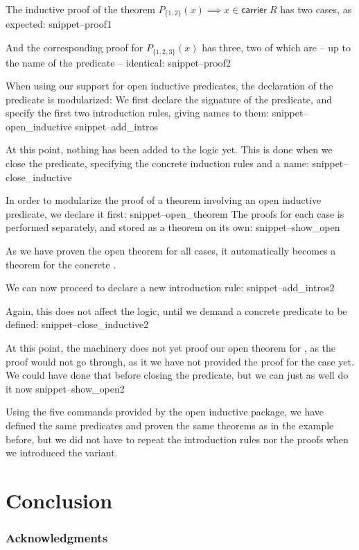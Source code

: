 \documentclass{llncs}
\newcommand{\carrier}[1]{\mathsf{carrier}\;#1}
\newcommand{\Snippet}[1]{\csname snippet--#1\endcsname}
\begin{document}
The inductive proof of the theorem $P_{\{1,2\}}(x) \implies x\in \carrier R$ has two cases, as expected:
\Snippet{proof1}

And the corresponding proof for $P_{\{1,2,3\}}(x)$ has three, two of which are -- up to the name of the predicate -- identical:
\Snippet{proof2}

When using our support for open inductive predicates, the declaration of the predicate is modularized: We first declare the signature of the predicate, and specify the first two introduction rules, giving names to them:
\Snippet{open_inductive}
\Snippet{add_intros}

At this point, nothing has been added to the logic yet. This is done when we close the predicate, specifying the concrete induction rules and a name:
\Snippet{close_inductive}

In order to modularize the proof of a theorem involving an open inductive predicate, we declare it first:
\Snippet{open_theorem}
The proofs for each case is performed separately, and stored as a theorem on its own:
\Snippet{show_open}

As we have proven the open theorem for all cases, it automatically becomes a theorem for the concrete .

We can now proceed to declare a new introduction rule:
\Snippet{add_intros2}

Again, this does not affect the logic, until we demand a concrete predicate to be defined:
\Snippet{close_inductive2}

At this point, the machinery does not yet proof our open theorem for  , as the proof would not go through, as it we have not provided the proof for the  case yet. We could have done that before closing the predicate, but we can just as well do it now
\Snippet{show_open2}

Using the five commands provided by the open inductive package, we have defined the same predicates and proven the same theorems as in the example before, but we did not have to repeat the introduction rules nor the proofs when we introduced the variant.








\section{Conclusion}

\subsubsection*{Acknowledgments}



\end{document}
